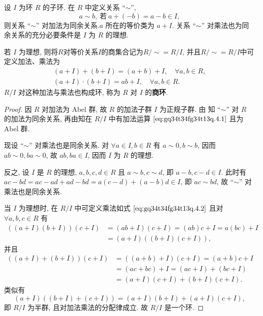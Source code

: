 \documentclass[../../main.tex]{subfiles}%
\begin{document}
\begin{theorem}\label{theorem:抽象代数-定理 1.4.1}
设 \( I \) 为环 \( R \) 的子环. 在 \( R \) 中定义关系 “\(\sim\)”,
\[
a \sim b, \ 若\ a + (-b) = a - b \in I,
\]
则关系 “\(\sim\)” 对加法为同余关系.\( a \) 所在的等价类为 \( a + I \).
关系 “\(\sim\)” 对乘法也为同余关系的充分必要条件是 \( I \) 为 \( R \) 的理想.

若 \( I \) 为理想, 则将$R$对等价关系$I$的商集合记为\( R/\sim = R/I \), 并且\( R/\sim = R/I \)中可定义加法、乘法为
\begin{gather}
(a + I) + (b + I) = (a + b) + I, \quad \forall a,b \in R, \label{eq:gq34t34fg34t13q.4.1}
\\
(a + I) \cdot (b + I) = ab + I, \quad \forall a,b \in R. \label{eq:gq34t34fg34t13q.4.2}
\end{gather}
\( R/I \) 对这种加法与乘法也构成环, 称为 \( R \) 对 \( I \) 的\textbf{商环}.
\end{theorem}
\begin{proof}
因 \( R \) 对加法为 Abel 群, 故 \( R \) 的加法子群 \( I \) 为正规子群. 由 知 “\(\sim\)” 对 \( R \) 的加法为同余关系, 再由知在 \( R/I \) 中有加法运算 \(\eqref{eq:gq34t34fg34t13q.4.1}\) 且为 Abel 群.

现设 “\(\sim\)” 对乘法也是同余关系. 对 \( \forall a \in I, b \in R \) 有 \( a \sim 0, b \sim b \), 因而 \( ab \sim 0, ba \sim 0 \), 故 \( ab, ba \in I \), 因而 \( I \) 为 \( R \) 的理想.

反之, 设 \( I \) 是 \( R \) 的理想, \( a,b,c,d \in R \) 且 \( a \sim b, c \sim d \), 即 \( a - b, c - d \in I \). 此时有 \( ac - bd = ac - ad + ad - bd = a(c - d) + (a - b)d \in I \), 即 \( ac \sim bd \), 故 “\(\sim\)” 对乘法也是同余关系.

当 \( I \) 为理想时, 在 \( R/I \) 中可定义乘法如式 \(\eqref{eq:gq34t34fg34t13q.4.2}\) 且对 \( \forall a,b,c \in R \) 有
\begin{align*}
((a + I)(b + I))(c + I) &= (ab + I)(c + I) = (ab)c + I = a(bc) + I \\
&= (a + I)((b + I)(c + I)),
\end{align*}
并且
\begin{align*}
((a + I) + (b + I))(c + I) &= ((a + b) + I)(c + I) 
= (a + b)c + I \\
&= (ac + bc) + I = (ac + I) + (bc + I) \\
&= (a + I)(c + I) + (b + I)(c + I).
\end{align*}
类似有
\[
(a + I)((b + I) + (c + I)) = (a + I)(b + I) + (a + I)(c + I),
\]
即 \( R/I \) 为半群, 且对加法乘法的分配律成立. 故 \( R/I \) 是一个环.
\end{proof}
\end{document}
